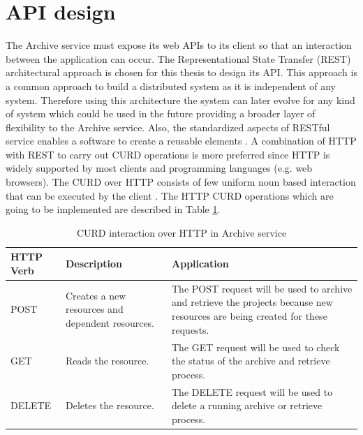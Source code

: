 \section{API design}
\label{section:APIDesign}
    The Archive service must expose its web APIs to its client so that an interaction between the application can occur.
    The Representational State Transfer (REST) \cite[Chapter.~5]{REST} architectural approach is chosen for this thesis
    to design its API. This approach is a 
    common approach to build a distributed system as it is independent of any system. Therefore using this architecture the system can later 
    evolve for any kind of system which could be used in the future providing a broader layer of flexibility to the Archive service. 
    Also, the standardized aspects of RESTful service enables a software to create a reusable elements \cite{RESTThesis}. A combination of HTTP with REST to carry out
    CURD operations is more preferred since HTTP is widely supported by most clients and programming languages (e.g. web browsers).
    The CURD over HTTP consists of few uniform noun based interaction that can be executed by the client \cite[p.~13]{RESTThesis}. The
    HTTP CURD operations which are going to be implemented are described in Table \ref{table:curdHttp}.

    \begin{table}[h!]
        \centering
        \begin{tabular}{|p{2cm}|p{4cm}|p{7cm}|}
            \hline
                \textbf{HTTP Verb}  & \textbf{Description} & \textbf{Application}\\
            \hline
                POST & 
                Creates a new resources and dependent resources.
                & The POST request will be used to archive and retrieve the projects because new resources are being created for these requests.\\
            \hline
                GET & Reads the resource. & The GET request will be used to check the status of the archive and retrieve process. \\
            \hline
                DELETE & Deletes the resource. & The DELETE request will be used to delete a running archive or retrieve process. \\                
            \hline
        \end{tabular}
        \caption{CURD interaction over HTTP in Archive service}
        \label{table:curdHttp}     
    \end{table}   
    
